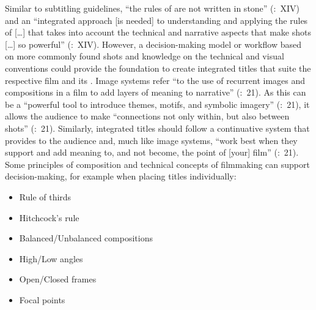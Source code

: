 Similar to subtitling guidelines, “the rules of  are not written in stone” (\citealt{mercado2010}:~XIV) and an “integrated approach [is needed] to understanding and applying the rules of  […] that takes into account the technical and narrative aspects that make shots […] so powerful” (\citeyear{mercado2010}:~XIV). However, a decision-making model or workflow based on more commonly found shots and knowledge on the technical and visual conventions could provide the foundation to create integrated titles that suite the respective film and its . Image systems refer “to the use of recurrent images and compositions in a film to add layers of meaning to narrative” (\citealt{mercado2010}:~21). As this can be a “powerful tool to introduce themes, motifs, and symbolic imagery” (\citeyear{mercado2010}:~21), it allows the audience to make “connections not only within, but also between shots” (\citeyear{mercado2010}:~21). Similarly, integrated titles should follow a continuative system that provides  to the audience and, much like image systems, “work best when they support and add meaning to, and not become, the point of [your] film” (\citeyear{mercado2010}:~21). Some principles of composition and technical concepts of filmmaking can support decision-making, for example when placing titles individually:


\begin{itemize}
\item Rule of thirds
\item Hitchcock’s rule
\item Balanced/Unbalanced compositions
\item High/Low angles
\item Open/Closed frames
\item Focal points
\end{itemize}

